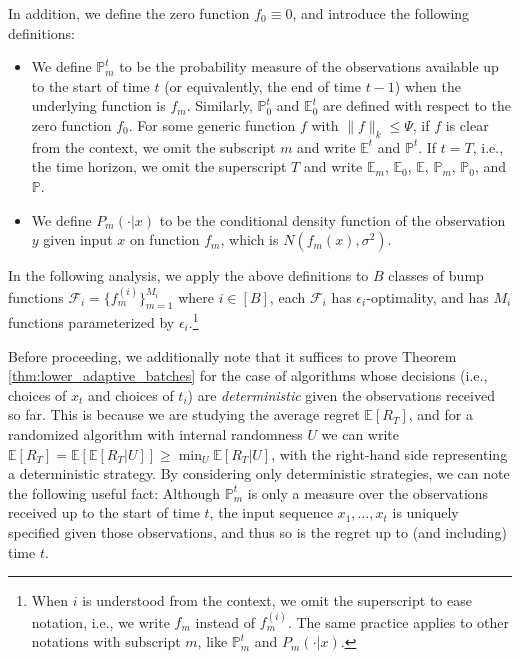 \documentclass[10pt]{article}
\begin{document}
In addition, we define the zero function $f_0\equiv0$, and introduce the following definitions:
\begin{itemize}
    \item We define $\mathbb{P}_m^t$ to be the probability measure of the observations available up to the start of time $t$ (or equivalently, the end of time $t-1$) when the underlying function is $f_m$.
    Similarly, $\mathbb{P}_0^t$ and $\mathbb{E}_0^t$ are defined with respect to the zero function $f_0$.
    For some generic function $f$ with $\lVert f\rVert_k\leq \Psi$, if $f$ is clear from the context, we omit the subscript $m$ and write $\mathbb{E}^t$ and $\mathbb{P}^t$. If $t=T$, i.e., the time horizon, we omit the superscript $T$ and write $\mathbb{E}_m$, $\mathbb{E}_0$, $\mathbb{E}$, $\mathbb{P}_m$, $\mathbb{P}_0$, and $\mathbb{P}$. 
    \item We define $P_m(\cdot|x)$ to be the conditional density function of the observation $y$ given input $x$ on function $f_m$, which is $N(f_m(x), \sigma^2)$.
\end{itemize}

In the following analysis, we apply the above definitions to $B$ classes of bump functions $\mathcal{F}_i=\{f^{(i)}_{m}\}_{m=1}^{M_i}$ where $i\in[B]$, each $\mathcal{F}_i$ has $\epsilon_i$-optimality, and has $M_i$ functions parameterized by $\epsilon_i$.\footnote{When $i$ is understood from the context, we omit the superscript to ease notation, i.e.,  we write $f_m$ instead of $ f^{(i)}_m $.
The same practice applies to other notations with subscript $m$, like $\mathbb{P}_m^t$ and $P_m(\cdot|x)$.
} 

Before proceeding, we additionally note that it suffices to prove Theorem \ref{thm:lower_adaptive_batches} for the case of algorithms whose decisions (i.e., choices of $x_t$ and choices of $t_i$) are \emph{deterministic} given the observations received so far.  This is because we are studying the average regret $\mathbb{E}[R_T]$, and for a randomized algorithm with internal randomness $U$ we can write $\mathbb{E}[R_T] = \mathbb{E}[ \mathbb{E}[R_T | U]] \ge \min_U \mathbb{E}[R_T | U]$, with the right-hand side representing a deterministic strategy.  By considering only deterministic strategies, we can note the following useful fact: Although $\mathbb{P}_m^t$ is only a measure over the observations received up to the start of time $t$, the input sequence $x_1,\dotsc,x_t$ is uniquely specified given those observations, and thus so is the regret up to (and including) time $t$.
\end{document}
